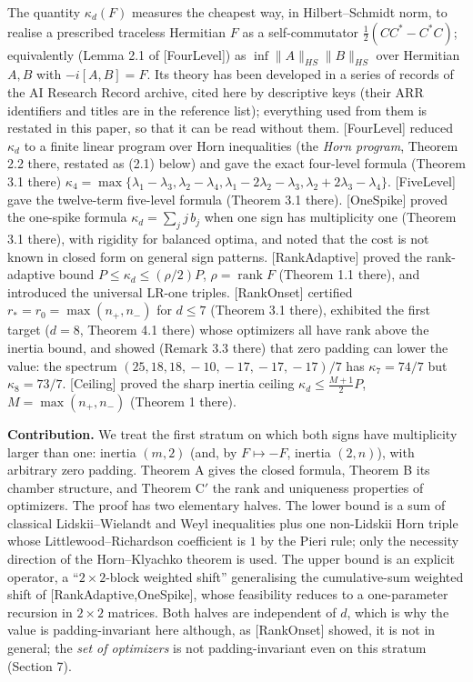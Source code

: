 \documentclass[
  11pt,
  a4paper,
]{article}
\begin{document}
The quantity \(\kappa_d(F)\) measures the cheapest way, in
Hilbert--Schmidt norm, to realise a prescribed traceless Hermitian \(F\)
as a self-commutator \(\tfrac12(CC^*-C^*C)\); equivalently (Lemma 2.1 of
{[}FourLevel{]}) as \(\inf\|A\|_{HS}\|B\|_{HS}\) over Hermitian \(A,\allowbreak{}B\)
with \(-i[A,\allowbreak{}B]=F\). Its theory has been developed in a series of records
of the AI Research Record archive, cited here by descriptive keys (their
ARR identifiers and titles are in the reference list); everything used
from them is restated in this paper, so that it can be read without
them. {[}FourLevel{]} reduced \(\kappa_d\) to a finite linear program
over Horn inequalities (the \emph{Horn program}, Theorem 2.2 there,
restated as (2.1) below) and gave the exact four-level formula (Theorem
3.1 there)
\(\kappa_4=\max\{\lambda_1-\lambda_3,\allowbreak{}\lambda_2-\lambda_4,\allowbreak{}\lambda_1-2\lambda_2-\lambda_3,\allowbreak{}\lambda_2+2\lambda_3-\lambda_4\}\).
{[}FiveLevel{]} gave the twelve-term five-level formula (Theorem 3.1
there). {[}OneSpike{]} proved the one-spike formula
\(\kappa_d=\sum_j j\,\allowbreak{}b_j\) when one sign has multiplicity one (Theorem
3.1 there), with rigidity for balanced optima, and noted that the cost
is not known in closed form on general sign patterns. {[}RankAdaptive{]}
proved the rank-adaptive bound \(P\le\kappa_d\le(\rho/2)P\),
\(\rho=\operatorname{rank}F\) (Theorem 1.1 there), and introduced the
universal LR-one triples. {[}RankOnset{]} certified
\(r_*=r_0=\max(n_+,\allowbreak{}n_-)\) for \(d\le7\) (Theorem 3.1 there), exhibited
the first target (\(d=8\), Theorem 4.1 there) whose optimizers all have
rank above the inertia bound, and showed (Remark 3.3 there) that zero
padding can lower the value: the spectrum
\((25,\allowbreak{}18,\allowbreak{}18,\allowbreak{}-10,\allowbreak{}-17,\allowbreak{}-17,\allowbreak{}-17)/7\) has \(\kappa_7=74/7\) but
\(\kappa_8=73/7\). {[}Ceiling{]} proved the sharp inertia ceiling
\(\kappa_d\le\frac{M+1}2P\), \(M=\max(n_+,\allowbreak{}n_-)\) (Theorem 1 there).

\textbf{Contribution.} We treat the first stratum on which both signs
have multiplicity larger than one: inertia \((m,\allowbreak{}2)\) (and, by
\(F\mapsto-F\), inertia \((2,\allowbreak{}n)\)), with arbitrary zero padding. Theorem
A gives the closed formula, Theorem B its chamber structure, and Theorem
C\('\) the rank and uniqueness properties of optimizers. The proof has
two elementary halves. The lower bound is a sum of classical
Lidskii--Wielandt and Weyl inequalities plus one non-Lidskii Horn triple
whose Littlewood--Richardson coefficient is \(1\) by the Pieri rule;
only the necessity direction of the Horn--Klyachko theorem is used. The
upper bound is an explicit operator, a ``\(2\times2\)-block weighted
shift'' generalising the cumulative-sum weighted shift of
{[}RankAdaptive,OneSpike{]}, whose feasibility reduces to a
one-parameter recursion in \(2\times2\) matrices. Both halves are
independent of \(d\), which is why the value is padding-invariant here
although, as {[}RankOnset{]} showed, it is not in general; the \emph{set
of optimizers} is not padding-invariant even on this stratum (Section
7).
\end{document}

